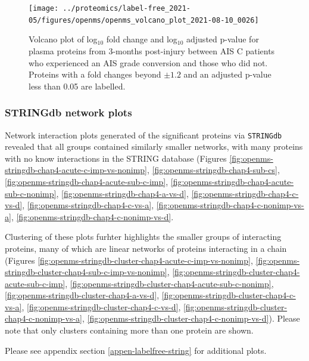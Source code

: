 \documentclass[
]{article}
\begin{document}
\begin{figure}
\texttt{[image: ../proteomics/label-free\_2021-05/figures/openms/openms\_volcano\_plot\_2021-08-10\_0026]} \caption{Volcano plot of log\(_10\) fold change and log\(_10\) adjusted p-value for plasma proteins from 3-months post-injury between AIS C patients who experienced an AIS grade conversion and those who did not. Proteins with a fold changes beyond \(\pm 1.2\) and an adjusted p-value less than 0.05 are labelled.}\label{fig:volc-plot-subacute-c-imp-vs-nonimp}
\end{figure}

\hypertarget{stringdb-network-plots-1}{%
\subsubsection{STRINGdb network plots}\label{stringdb-network-plots-1}}

Network interaction plots generated of the significant proteins via \texttt{STRINGdb} revealed that all groups contained similarly smaller networks, with many proteins with no know interactions in the STRING database (Figures \ref{fig:openms-stringdb-chap4-acute-c-imp-vs-nonimp}, \ref{fig:openms-stringdb-chap4-sub-cs}, \ref{fig:openms-stringdb-chap4-acute-sub-c-imp}, \ref{fig:openms-stringdb-chap4-acute-sub-c-nonimp}, \ref{fig:openms-stringdb-chap4-a-vs-d}, \ref{fig:openms-stringdb-chap4-c-vs-d}, \ref{fig:openms-stringdb-chap4-c-vs-a}, \ref{fig:openms-stringdb-chap4-c-nonimp-vs-a}, \ref{fig:openms-stringdb-chap4-c-nonimp-vs-d}.

Clustering of these plots furhter highlights the smaller groups of interacting proteins, many of which are linear networks of proteins interacting in a chain (Figures \ref{fig:openms-stringdb-cluster-chap4-acute-c-imp-vs-nonimp}, \ref{fig:openms-stringdb-cluster-chap4-sub-c-imp-vs-nonimp}, \ref{fig:openms-stringdb-cluster-chap4-acute-sub-c-imp}, \ref{fig:openms-stringdb-cluster-chap4-acute-sub-c-nonimp}, \ref{fig:openms-stringdb-cluster-chap4-a-vs-d}, \ref{fig:openms-stringdb-cluster-chap4-c-vs-a}, \ref{fig:openms-stringdb-cluster-chap4-c-vs-d}, \ref{fig:openms-stringdb-cluster-chap4-c-nonimp-vs-a}, \ref{fig:openms-stringdb-cluster-chap4-c-nonimp-vs-d}).
Please note that only clusters containing more than one protein are shown.

Please see appendix section \ref{appen-labelfree-string} for additional plots.
\end{document}
